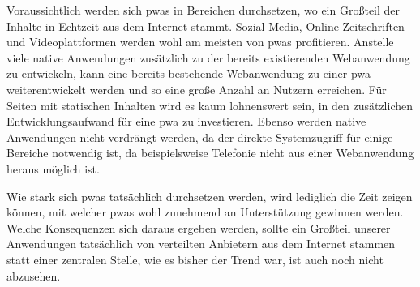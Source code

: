 \documentclass[12pt, parskip=half]{scrartcl}       %
\begin{document}
Voraussichtlich werden sich \acp{pwa} in Bereichen durchsetzen, wo ein Großteil der Inhalte in Echtzeit aus dem Internet stammt.
Sozial Media, Online-Zeitschriften und Videoplattformen werden wohl am meisten von \acp{pwa} profitieren.
Anstelle viele native Anwendungen zusätzlich zu der bereits existierenden Webanwendung zu entwickeln, kann eine bereits bestehende Webanwendung zu einer \ac{pwa} weiterentwickelt werden und so eine große Anzahl an Nutzern erreichen.
Für Seiten mit statischen Inhalten wird es kaum lohnenswert sein, in den zusätzlichen Entwicklungsaufwand für eine \ac{pwa} zu investieren.
Ebenso werden native Anwendungen nicht verdrängt werden, da der direkte Systemzugriff für einige Bereiche notwendig ist, da beispielsweise Telefonie nicht aus einer Webanwendung heraus möglich ist.

Wie stark sich \acp{pwa} tatsächlich durchsetzen werden, wird lediglich die Zeit zeigen können, mit welcher \acp{pwa} wohl zunehmend an Unterstützung gewinnen werden.
Welche Konsequenzen sich daraus ergeben werden, sollte ein Großteil unserer Anwendungen tatsächlich von verteilten Anbietern aus dem Internet stammen statt einer zentralen Stelle, wie es bisher der Trend war, ist auch noch nicht abzusehen.

\newpage

\printbibliography
\end{document}
